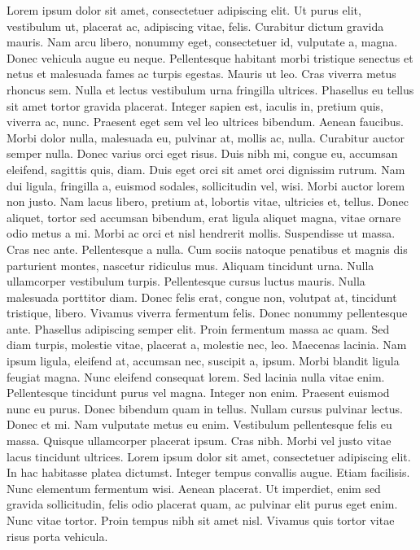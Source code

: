 \documentclass[draft,12pt,twoside,a4paper]{book}
\begin{document}
Lorem ipsum dolor sit amet, consectetuer adipiscing elit.
Ut purus elit, vestibulum ut, placerat ac, adipiscing vitae, felis.
Curabitur dictum gravida mauris.
Nam arcu libero, nonummy eget, consectetuer id, vulputate a, magna.
Donec vehicula augue eu neque.
Pellentesque habitant morbi tristique senectus et netus et malesuada
 fames ac turpis egestas.
Mauris ut leo.
Cras viverra metus rhoncus sem.
Nulla et lectus vestibulum urna fringilla ultrices.
Phasellus eu tellus sit amet tortor gravida placerat.
Integer sapien est, iaculis in, pretium quis, viverra ac, nunc.
Praesent eget sem vel leo ultrices bibendum.
Aenean faucibus.
Morbi dolor nulla, malesuada eu, pulvinar at, mollis ac, nulla.
Curabitur auctor semper nulla.
Donec varius orci eget risus.
Duis nibh mi, congue eu, accumsan eleifend, sagittis quis, diam.
Duis eget orci sit amet orci dignissim rutrum.
Nam dui ligula, fringilla a, euismod sodales, sollicitudin vel, wisi.
Morbi auctor lorem non justo.
Nam lacus libero, pretium at, lobortis vitae, ultricies et, tellus.
Donec aliquet, tortor sed accumsan bibendum, erat ligula aliquet magna,
 vitae ornare odio metus a mi.
Morbi ac orci et nisl hendrerit mollis.
Suspendisse ut massa.
Cras nec ante.
Pellentesque a nulla.
Cum sociis natoque penatibus et magnis dis parturient montes,
 nascetur ridiculus mus.
Aliquam tincidunt urna.
Nulla ullamcorper vestibulum turpis.
Pellentesque cursus luctus mauris.
Nulla malesuada porttitor diam.
Donec felis erat, congue non, volutpat at, tincidunt tristique, libero.
Vivamus viverra fermentum felis.
Donec nonummy pellentesque ante.
Phasellus adipiscing semper elit.
Proin fermentum massa ac quam.
Sed diam turpis, molestie vitae, placerat a, molestie nec, leo.
Maecenas lacinia.
Nam ipsum ligula, eleifend at, accumsan nec, suscipit a, ipsum.
Morbi blandit ligula feugiat magna.
Nunc eleifend consequat lorem.
Sed lacinia nulla vitae enim.
Pellentesque tincidunt purus vel magna.
Integer non enim.
Praesent euismod nunc eu purus.
Donec bibendum quam in tellus.
Nullam cursus pulvinar lectus.
Donec et mi.
Nam vulputate metus eu enim.
Vestibulum pellentesque felis eu massa.
Quisque ullamcorper placerat ipsum.
Cras nibh.
Morbi vel justo vitae lacus tincidunt ultrices.
Lorem ipsum dolor sit amet, consectetuer adipiscing elit.
In hac habitasse platea dictumst.
Integer tempus convallis augue.
Etiam facilisis.
Nunc elementum fermentum wisi.
Aenean placerat.
Ut imperdiet, enim sed gravida sollicitudin, felis odio placerat quam,
 ac pulvinar elit purus eget enim.
Nunc vitae tortor.
Proin tempus nibh sit amet nisl.
Vivamus quis tortor vitae risus porta vehicula.
\end{document}
